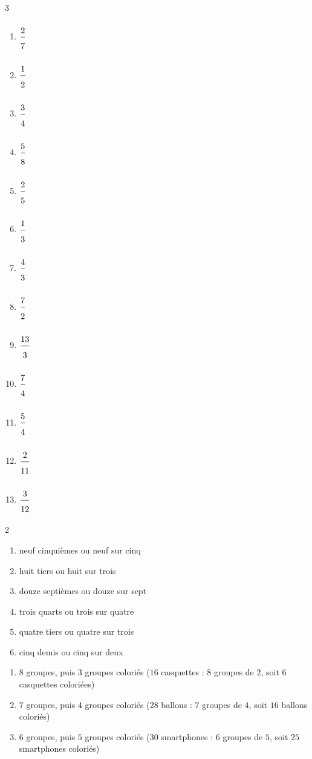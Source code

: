 \ExoC
\begin{multicols}{3}
\begin{enumerate}[leftmargin=*,align=parleft, label=\alph*), itemsep=6pt, topsep=2pt]
\item $\FA{2}{7}$
\item $\FA{1}{2}$
\item $\FA{3}{4}$
\item $\FA{5}{8}$
\item $\FA{2}{5}$
\item $\FA{1}{3}$
\item $\FA{4}{3}$
\item $\FA{7}{2}$
\item $\FA{13}{3}$
\item $\FA{7}{4}$
\item $\FA{5}{4}$
\item $\FA{2}{11}$
\item $\FA{3}{12}$
\end{enumerate}
\end{multicols}

\ExoC
\begin{multicols}{2}
\begin{enumerate}[leftmargin=*,align=parleft, label=\alph*), itemsep=6pt, topsep=2pt]
\item neuf cinquièmes ou neuf sur cinq
\item huit tiers ou huit sur trois
\item douze septièmes ou douze sur sept
\item trois quarts ou trois sur quatre
\item quatre tiers ou quatre sur trois
\item cinq demis ou cinq sur deux
\end{enumerate}
\end{multicols}

\ExoC
\begin{enumerate}[leftmargin=*,align=parleft, label=\alph*), itemsep=6pt, topsep=2pt]
\item $8$ groupes, puis $3$ groupes coloriés ($16$ casquettes : $8$ groupes de $2$, soit $6$ casquettes coloriées)
\item $7$ groupes, puis $4$ groupes coloriés ($28$ ballons : $7$ groupes de $4$, soit $16$ ballons coloriés)
\item $6$ groupes, puis $5$ groupes coloriés ($30$ smartphones : $6$ groupes de $5$, soit $25$ smartphones coloriés)
\end{enumerate}

